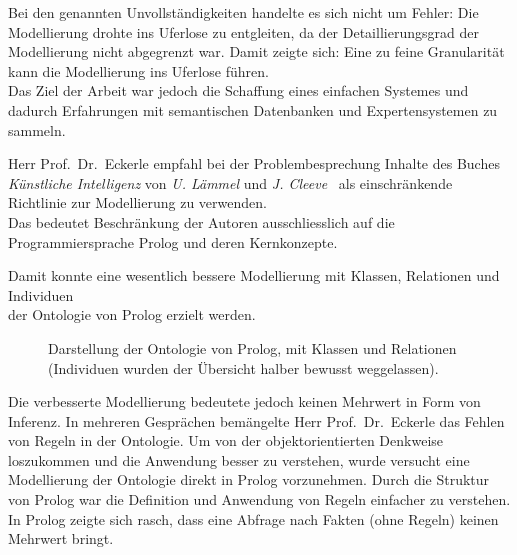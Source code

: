 Bei den genannten Unvollständigkeiten handelte es sich nicht um Fehler: Die Modellierung drohte ins Uferlose zu entgleiten, da der Detaillierungsgrad der Modellierung nicht abgegrenzt war. Damit zeigte sich: Eine zu feine Granularität kann die Modellierung ins Uferlose führen.\\
Das Ziel der Arbeit war jedoch die Schaffung eines einfachen Systemes und dadurch Erfahrungen mit semantischen Datenbanken und Expertensystemen zu sammeln.

Herr Prof.\ Dr.\ Eckerle empfahl bei der Problembesprechung Inhalte des Buches \textit{Künstliche Intelligenz} von \textit{U. Lämmel} und \textit{J. Cleeve}~\cite{laemmel} als einschränkende Richtlinie zur Modellierung zu verwenden.\\
Das bedeutet Beschränkung der Autoren ausschliesslich auf die Programmiersprache Prolog und deren Kernkonzepte.

Damit konnte eine wesentlich bessere Modellierung mit Klassen, Relationen und Individuen\\
der Ontologie von Prolog erzielt werden.

\begin{figure}[H]
\centering {}
\caption{Darstellung der Ontologie von Prolog, mit Klassen und Relationen (Individuen wurden der Übersicht halber bewusst weggelassen).\label{fig:prolog_baum}\protect\footnotemark}
\end{figure}

Die verbesserte Modellierung bedeutete jedoch keinen Mehrwert in Form von Inferenz. In mehreren Gesprächen bemängelte Herr Prof.\ Dr.\ Eckerle das Fehlen von Regeln in der Ontologie. Um von der objektorientierten Denkweise loszukommen und die Anwendung besser zu verstehen, wurde versucht eine Modellierung der Ontologie direkt in Prolog vorzunehmen. Durch die Struktur von Prolog war die Definition und Anwendung von Regeln einfacher zu verstehen. In Prolog zeigte sich rasch, dass eine Abfrage nach Fakten (ohne Regeln) keinen Mehrwert bringt.

